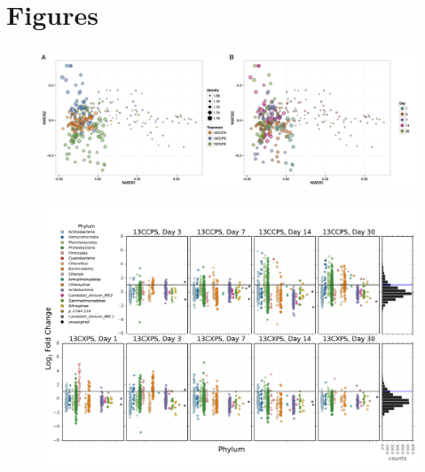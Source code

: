 \section{Figures}
\begin{figure}[H]
	\begin{center}
	\centerline{\includegraphics[width=\textwidth]{figures/ordination_all1/ordination_all1.png}}
	\caption{\protect}\label{fig:ord}
        \end{center}
\end{figure}

\begin{figure}[H]
	\begin{center}
	\centerline{\includegraphics[width=\textwidth]{figures/l2fc_fig1/l2fc_fig.pdf}}
	\caption{\protect}\label{fig:l2fc}
        \end{center}
\end{figure}

